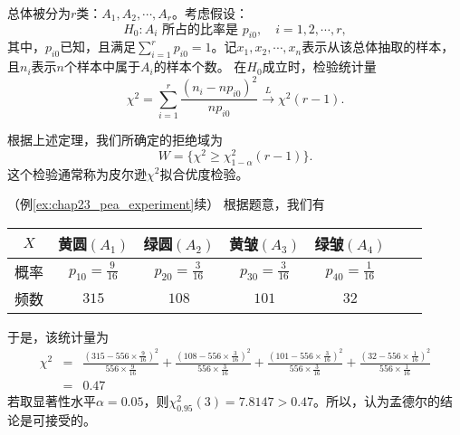     \begin{theorem}
    总体被分为$r$类：$A_1,A_2,\cdots,A_r$。考虑假设：
    $$
    H_0: A_i\text{ 所占的比率是 }p_{i0},\quad i=1,2,\cdots,r,    $$
    其中，$p_{i0}$已知，且满足$\sum_{i=1}^r p_{i0}=1$。记$x_1,x_2,\cdots,x_n$表示从该总体抽取的样本，且$n_i$表示$n$个样本中属于$A_i$的样本个数。
    在$H_0$成立时，检验统计量
    $$
    \chi^2 = \sum_{i=1}^r \frac{(n_i - np_{i0})^2}{np_{i0}} \overset{L}{\rightarrow} \chi^2(r-1).
    $$
    \end{theorem}
    \begin{remark}
        根据上述定理，我们所确定的拒绝域为
        $$
        W = \{\chi^2 \geq \chi^2_{1-\alpha}(r-1)\}.
        $$
        这个检验通常称为皮尔逊$\chi^2$拟合优度检验。
    \end{remark}
    \begin{example}{（例\ref{ex:chap23_pea_experiment}续）}
        根据题意，我们有
        \begin{table}[htbp]
  \centering
  \begin{tabular}{ccccccc}
  \hline
    $X$& 黄圆$(A_{1})$ 
    & 绿圆$(A_{2})$ 
    & 黄皱$(A_{3})$ 
    & 绿皱$(A_{4})$ \\
  \hline
    概率 & $p_{10}=\frac{9}{16}$ 
    & $p_{20}=\frac{3}{16}$
    & $p_{30}=\frac{3}{16}$
    & $p_{40}=\frac{1}{16}$
     \\
     \hline
    频数& $315$ 
    & $108$
    & $101$
    & $32$
     \\
  \hline
  \end{tabular}
\end{table}

于是，该统计量为
\begin{eqnarray*}
    \chi^2 &=& \frac{\left(315 - 556 \times \frac{9}{16}\right)^2}{ 556 \times \frac{9}{16}} + 
\frac{\left(108 - 556 \times \frac{3}{16}\right)^2}{ 556 \times \frac{3}{16}} + 
\frac{\left(101 - 556 \times \frac{3}{16}\right)^2}{ 556 \times \frac{3}{16}} + 
\frac{\left(32 - 556 \times \frac{1}{16}\right)^2}{ 556 \times \frac{1}{16}}\\
&=& 0.47
\end{eqnarray*}
若取显著性水平$\alpha = 0.05$，则$\chi^2_{0.95}(3) = 7.8147 > 0.47$。所以，认为孟德尔的结论是可接受的。
    \end{example}

